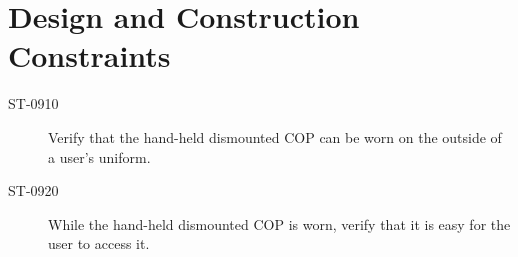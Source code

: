 \section{Design and Construction Constraints}

\begin{description}
\item[ST-0910]Verify that the hand-held dismounted COP can be worn on the outside of a user's uniform.
\item[ST-0920]While the hand-held dismounted COP is worn, verify that it is easy for the user to access it. 
\end{description}
